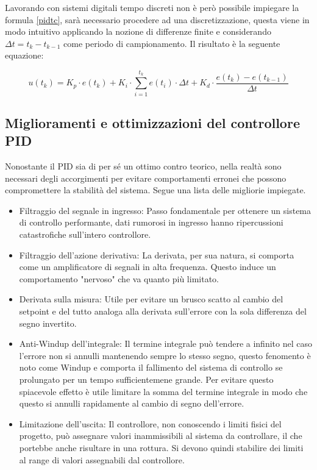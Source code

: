 \documentclass[11pt]{article}
\begin{document}
Lavorando con sistemi digitali tempo discreti non è però possibile impiegare la formula \ref{pidtc}, sarà necessario procedere ad una discretizzazione, questa viene in modo intuitivo applicando la nozione di differenze finite e considerando $\Delta t = t_k - t_{k-1}$ come periodo di campionamento. Il risultato è la seguente equazione:

\begin{equation}\label{pidtd}
    u(t_k)=K_p \cdot e(t_k) + K_i \cdot \sum_{i=1}^{t_k} e(t_i)\cdot \Delta t + K_d\cdot \frac{e(t_k)-e(t_{k-1})}{\Delta t}
\end{equation}



\subsection{Miglioramenti e ottimizzazioni del controllore PID}
Nonostante il PID sia di per sé un ottimo contro teorico, nella realtà sono necessari degli accorgimenti per evitare comportamenti erronei che possono compromettere la stabilità del sistema. Segue una lista delle migliorie impiegate.
\begin{itemize}
\item Filtraggio del segnale in ingresso: Passo fondamentale per ottenere un sistema di controllo performante, dati rumorosi in ingresso hanno ripercussioni catastrofiche sull'intero controllore.
\item Filtraggio dell'azione derivativa: La derivata, per sua natura, si comporta come un amplificatore di segnali in alta frequenza. Questo induce un comportamento "nervoso" che va quanto più limitato. 
\item Derivata sulla misura: Utile per evitare un brusco scatto al cambio del setpoint e del tutto analoga alla derivata sull'errore con la sola differenza del segno invertito.
\item Anti-Windup dell'integrale: Il termine integrale può tendere a infinito nel caso l'errore non si annulli mantenendo sempre lo stesso segno, questo fenomento è noto come Windup e comporta il fallimento del sistema di controllo se prolungato per un tempo sufficientemene grande. Per evitare questo spiacevole effetto è utile limitare la somma del termine integrale in modo che questo si annulli rapidamente al cambio di segno dell'errore.
\item Limitazione dell'uscita: Il controllore, non conoscendo i limiti fisici del progetto, può assegnare valori inammissibili al sistema da controllare, il che portebbe anche risultare in una rottura. Si devono quindi stabilire dei limiti al range di valori assegnabili dal controllore.
\end{itemize}
\end{document}
